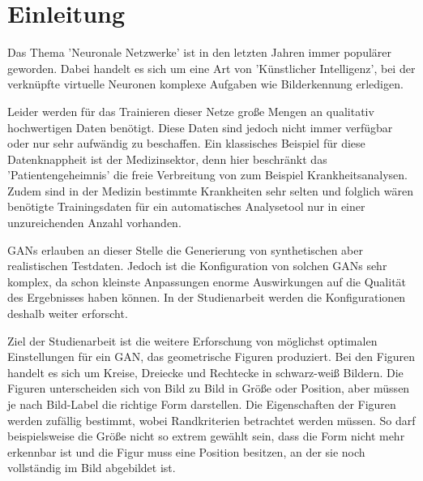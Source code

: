 
\chapter{Einleitung}

Das Thema 'Neuronale Netzwerke' ist in den letzten Jahren immer populärer geworden.
Dabei handelt es sich um eine Art von 'Künstlicher Intelligenz', bei der verknüpfte virtuelle Neuronen komplexe Aufgaben wie Bilderkennung erledigen.

Leider werden für das Trainieren dieser Netze große Mengen an qualitativ hochwertigen Daten benötigt.
Diese Daten sind jedoch nicht immer verfügbar oder nur sehr aufwändig zu beschaffen.
Ein klassisches Beispiel für diese Datenknappheit ist der Medizinsektor, denn hier beschränkt das 'Patientengeheimnis' die freie Verbreitung von zum Beispiel Krankheitsanalysen.
Zudem sind in der Medizin bestimmte Krankheiten sehr selten und folglich wären benötigte Trainingsdaten für ein automatisches Analysetool nur in einer unzureichenden Anzahl vorhanden.

GANs erlauben an dieser Stelle die Generierung von synthetischen aber realistischen Testdaten.
Jedoch ist die Konfiguration von solchen GANs sehr komplex, da schon kleinste Anpassungen enorme Auswirkungen auf die Qualität des Ergebnisses haben können.
In der Studienarbeit werden die Konfigurationen deshalb weiter erforscht.
\newline

Ziel der Studienarbeit ist die weitere Erforschung von möglichst optimalen Einstellungen für ein GAN, das geometrische Figuren produziert.
Bei den Figuren handelt es sich um Kreise, Dreiecke und Rechtecke in schwarz-weiß Bildern.
Die Figuren unterscheiden sich von Bild zu Bild in Größe oder Position, aber müssen je nach Bild-Label die richtige Form darstellen.
Die Eigenschaften der Figuren werden zufällig bestimmt, wobei Randkriterien betrachtet werden müssen.
So darf beispielsweise die Größe nicht so extrem gewählt sein, dass die Form nicht mehr erkennbar ist und die Figur muss eine Position besitzen, an der sie noch vollständig im Bild abgebildet ist.
